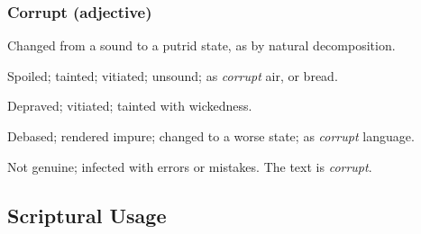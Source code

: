 	\subsubsection{Corrupt (adjective)}
	
		\begin{compactitem}
			\item[1] Changed from a sound to a putrid state, as by natural decomposition.
			\item[2] Spoiled; tainted; vitiated; unsound; as \textit{corrupt} air, or bread.
			\item[3] Depraved; vitiated; tainted with wickedness.
			\item[4] Debased; rendered impure; changed to a worse state; as \textit{corrupt} language.
			\item[5] Not genuine; infected with errors or mistakes. The text is \textit{corrupt}.
		\end{compactitem}



\subsection{Scriptural Usage} %
	\label{CORRUPTION-SCRIPTURES}

	
	
			
